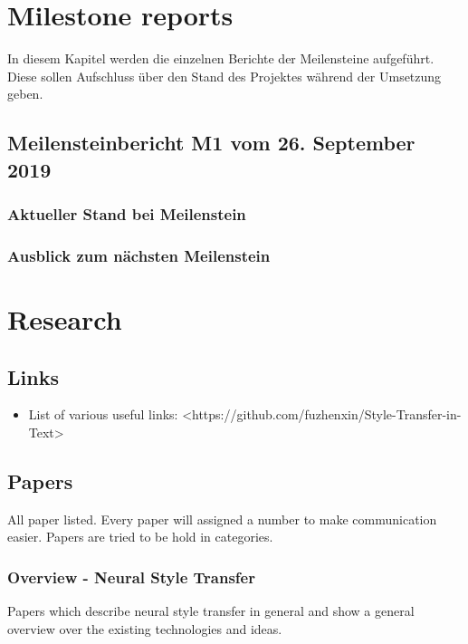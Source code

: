 \chapter{Milestone reports}
\label{app:Milestone-Reports}
In diesem Kapitel werden die einzelnen Berichte der Meilensteine aufgeführt. Diese sollen Aufschluss über den Stand des
Projektes während der Umsetzung geben.

\section{Meilensteinbericht M1 vom 26. September 2019}

\subsection{Aktueller Stand bei Meilenstein}

\subsection{Ausblick zum nächsten Meilenstein}

\chapter{Research}
\label{app:Research}

\section{Links}
\begin{itemize}
    \item List of various useful links: <https://github.com/fuzhenxin/Style-Transfer-in-Text>
\end{itemize}

\section{Papers}
All paper listed. Every paper will assigned a number to make communication easier. Papers are tried to be hold in
categories.

\subsection{Overview - Neural Style Transfer}
Papers which describe neural style transfer in general and show a general overview over the existing technologies and
ideas.


